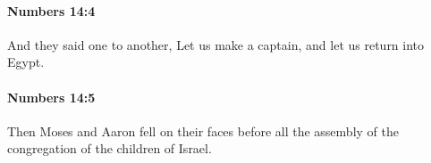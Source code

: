 		\paragraph{Numbers 14:4} %
			\label{NUMBERS-14-4}

			And they said one to another, Let us make a captain, and let us return into Egypt.


		\paragraph{Numbers 14:5} %
			\label{NUMBERS-14-5}

			Then Moses and Aaron fell on their faces before all the assembly of the congregation of the children of Israel.


